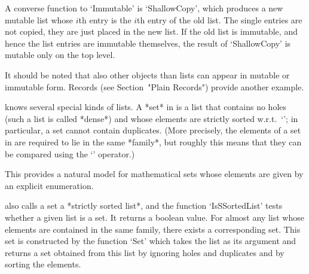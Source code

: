 A converse function to `Immutable' is `ShallowCopy', which produces a
new mutable list whose $i$th entry is the $i$th entry of the old
list. The single entries are not copied, they are just placed in the
new list.  If the old list is immutable, and hence the list entries
are immutable themselves, the result of `ShallowCopy' is mutable only
on the top level.

It should be noted that also other objects than lists can appear in
mutable or immutable form.
Records (see Section~"Plain Records") provide another example.

%


{\GAP} knows several special kinds of lists.  A *set* in {\GAP} is a
list that contains no holes (such a list is called *dense*) and whose
elements are strictly sorted w.r.t.~`\<'; in particular, a set cannot
contain duplicates.  (More precisely, the elements of a set in {\GAP}
are required to lie in the same *family*, but roughly this means that
they can be compared using the `\<' operator.)

This provides a natural model for mathematical sets whose elements are
given by an explicit enumeration.

{\GAP} also calls a set a *strictly sorted list*, and the function
`IsSSortedList' tests whether a given list is a set.  It returns a
boolean value.  For almost any list whose elements are contained in
the same family, there exists a corresponding set.  This set is
constructed by the function `Set' which takes the list as its argument
and returns a set obtained from this list by ignoring holes and
duplicates and by sorting the elements.


